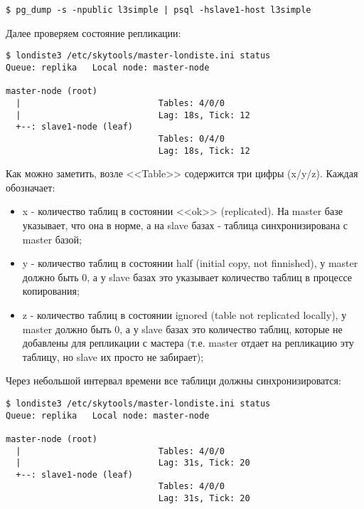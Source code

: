 \begin{lstlisting}[label=lst:londiste-replica-dump1,caption=Клонирование структуры базы]
$ pg_dump -s -npublic l3simple | psql -hslave1-host l3simple
\end{lstlisting}

Далее проверяем состояние репликации:

\begin{lstlisting}[label=lst:londiste-replica15,caption=Статус кластера]
$ londiste3 /etc/skytools/master-londiste.ini status
Queue: replika   Local node: master-node

master-node (root)
  |                           Tables: 4/0/0
  |                           Lag: 18s, Tick: 12
  +--: slave1-node (leaf)
                              Tables: 0/4/0
                              Lag: 18s, Tick: 12
\end{lstlisting}

Как можно заметить, возле <<Table>> содержится три цифры (x/y/z). Каждая обозначает:

\begin{itemize}
  \item x - количество таблиц в состоянии <<ok>> (replicated). На master базе указывает, что она в норме, а на slave базах - таблица синхронизирована с master базой;
  \item y - количество таблиц в состоянии half (initial copy, not finnished), у master должно быть 0, а у slave базах это указывает количество таблиц в процессе копирования;
  \item z - количество таблиц в состоянии ignored (table not replicated locally), у master должно быть 0, а у slave базах это количество таблиц, которые не добавлены для репликации с мастера (т.е. master отдает на репликацию эту таблицу, но slave их просто не забирает);
\end{itemize}

Через небольшой интервал времени все таблици должны синхронизироватся:

\begin{lstlisting}[label=lst:londiste-replica16,caption=Статус кластера]
$ londiste3 /etc/skytools/master-londiste.ini status
Queue: replika   Local node: master-node

master-node (root)
  |                           Tables: 4/0/0
  |                           Lag: 31s, Tick: 20
  +--: slave1-node (leaf)
                              Tables: 4/0/0
                              Lag: 31s, Tick: 20
\end{lstlisting}

